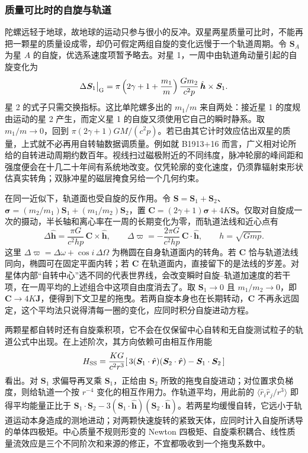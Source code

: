 \subsubsection{质量可比时的自旋与轨道}

陀螺远轻于地球，故地球的运动只参与很小的反冲。双星两星质量可比时，不能再把一颗星的质量设成零，却仍可假定两组自旋的变化远慢于一个轨道周期。令 $\bm S_A$ 为星 $A$ 的自旋，优选系速度项暂予略去。对星 1，一周中由轨道角动量引起的自旋变化为
\[
 \Delta\bm S_1\big|_{\rm G}=
    \pi\left(2\gamma+1+\frac{m_1}{m}\right)
      \frac{Gm_2}{c^2p}\,\hat{\bm h}\times\bm S_1 .
\]
星 2 的式子只需交换指标。这比单陀螺多出的 $m_1/m$ 来自两处：接近星 1 的度规由运动的星 2 产生，而定义星 1 的自旋又须使用它自己的瞬时静系。取 $m_1/m\to0$，回到 $\pi(2\gamma+1)GM/(c^2p)$。若已由其它计时效应估出双星的质量，上式就不必再用自转轴数据调质量。例如就 B1913+16 而言，广义相对论所给的自转进动周期约数百年。视线扫过磁极附近的不同纬度，脉冲轮廓的峰间距和强度便会在十几二十年间有系统地改变。仅凭轮廓的变化速度，仍须靠辐射束形状估真实转角；双脉冲星的磁层掩食另给一个几何约束。

在同一近似下，轨道面也受自旋的反作用。令 $\bm S=\bm S_1+\bm S_2$、$\bm\sigma=(m_2/m_1)\bm S_1+(m_1/m_2)\bm S_2$，置 $\bm C=(2\gamma+1)\bm\sigma+4K\bm S$。仅取对自旋成一次的摄动，半长轴和离心率在一周的长期变化为零，而轨道法线和近心点有
\[
 \Delta\hat{\bm h}=\frac{\pi G}{c^2hp}\,\bm C\times\hat{\bm h},
 \qquad \Delta\varpi=-\frac{2\pi G}{c^2hp}\,\bm C\cdot\hat{\bm h},
 \qquad h=\sqrt{Gmp}.
\]
这里 $\Delta\varpi=\Delta\omega+\cos i\,\Delta\Omega$ 为椭圆在自身轨道面内的转角。若 $\bm C$ 恰与轨道法线同向，椭圆可在固定平面内转；若 $\bm C$ 在轨道面内，直接留下的是法线的岁差。对星体内部“自转中心”选不同的代表世界线，会改变瞬时自旋--轨道加速度的若干项，在一周平均的上述组合中这项自由度消去了。取 $\bm S_1\to0$ 且 $m_1/m_2\to0$，即 $\bm C\to4K\bm J$，便得到下文卫星的拖曳。若两自旋本身也在长期转动，$\bm C$ 不再永远固定，这个平均法只说得清每一圈的变化，应同时积分自旋进动方程。

两颗星都自转时还有自旋乘积项，它不会在仅保留中心自转和无自旋测试粒子的轨道公式中出现。在上述阶次，其方向依赖可由相互作用能
\[
 H_{\rm SS}=\frac{KG}{c^2r^3}
   [\,3(\bm S_1\cdot\hat{\bm r})(\bm S_2\cdot\hat{\bm r})
                              -\bm S_1\cdot\bm S_2\,]
\]
看出。对 $\bm S_1$ 求偏导再叉乘 $\bm S_1$，正给由 $\bm S_2$ 所致的拖曳自旋进动；对位置求负梯度，则给轨道一个按 $r^{-4}$ 变化的相互作用力。作轨道平均，用此前的 $\langle \hat r_i\hat r_j/r^3\rangle$ 即得平均能量正比于 $\bm S_1\cdot\bm S_2-3(\bm S_1\cdot\hat{\bm h})(\bm S_2\cdot\hat{\bm h})$。若两星均缓慢自转，它远小于轨道运动本身造成的测地进动；对两颗快速旋转的紧致天体，应同时计入自旋所诱导的单体四极矩。中心质量不规则形变的 Newton 四极矩、自旋乘积耦合、线性质量流效应是三个不同阶次和来源的修正，不宜都吸收到一个拖曳系数中。

